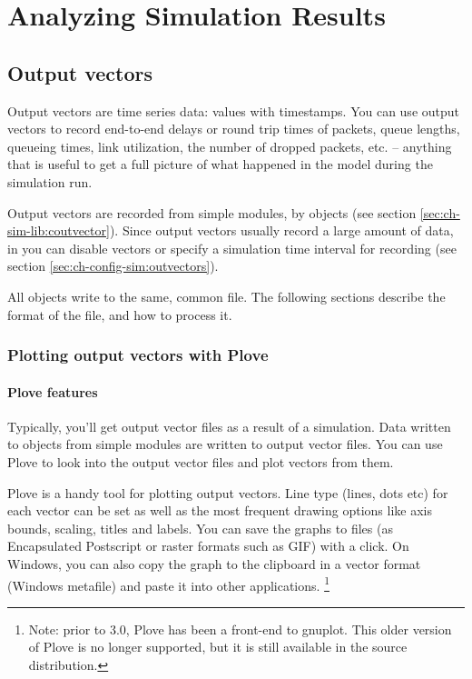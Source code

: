 \chapter{Analyzing Simulation Results}
\label{cha:analyzing-simulation-results}


\section{Output vectors}
\label{sec:ch-ana-sim:output-vectors}

Output vectors are time series data: values with timestamps.
You can use output vectors to record end-to-end delays or
round trip times of packets, queue lengths, queueing times,
link utilization, the number of dropped packets, etc. --
anything that is useful to get a full picture of what happened
in the model during the simulation run.

Output vectors are recorded from simple modules, by  objects
(see section \ref{sec:ch-sim-lib:coutvector}). Since output vectors usually
record a large amount of data, in  you can disable vectors
or specify a simulation time interval for recording
(see section \ref{sec:ch-config-sim:outvectors}).

All  objects write to the same, common file.
The following sections describe the format of the file, and
how to process it.


\subsection{Plotting output vectors with Plove}

\subsubsection{Plove features}

Typically, you'll get output vector files as a result of a simulation.
Data written to  objects from
simple modules are written to output vector
files. You can use Plove to look
into the output vector files and plot vectors from them.

Plove is a handy tool for plotting
{\opp} output vectors. Line type (lines, dots etc) for each vector can be set
as well as the most frequent drawing options like axis bounds, scaling, titles
and labels. You can save the graphs to files (as Encapsulated Postscript or
raster formats such as GIF) with a click. On Windows, you can also
copy the graph to the clipboard in a vector format (Windows metafile)
and paste it into other applications.
    \footnote{Note: prior to {\opp} 3.0, Plove has been a front-end to
    gnuplot. This older version of Plove is no longer supported, but it is still
    available in the {\opp} source distribution.}

